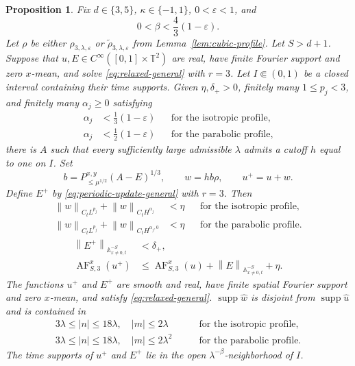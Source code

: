 \documentclass[12pt,reqno,letterpaper]{amsart}
\numberwithin{equation}{section}
\newtheorem{proposition}[theorem]{Proposition}
\theoremstyle{definition}
\newcommand{\T}{\mathbb T}
\newcommand{\A}{\mathbb A}
\newcommand{\eps}{\varepsilon}
\newcommand{\la}{\lambda}
\newcommand{\supp}{\operatorname{supp}}
\newcommand{\norm}[1]{\left\lVert #1\right\rVert}
\newcommand{\abs}[1]{\left\lvert #1\right\rvert}
\begin{document}
\begin{proposition}
\label{prop:cubic-periodic-onestep}
Fix $d\in\{3,5\}$, $\kappa\in\{-1,1\}$,
$0<\eps<1$, and
\[
 0<\beta<\frac43(1-\eps).
\]
Let $\rho$ be either $\rho_{3,\la,\eps}$ or
$\widetilde{\rho}_{3,\la,\eps}$ from
Lemma~\ref{lem:cubic-profile}.
Let $S>d+1$.  Suppose that $u,E\in C^\infty([0,1]\times\T^2)$
are real, have finite Fourier support and zero $x$-mean, and solve
\eqref{eq:relaxed-general} with $r=3$.
Let $I\Subset(0,1)$ be a closed interval containing their time supports.
Given $\eta,\delta_+>0$, finitely many $1\leq p_j<3$, and finitely
many $\alpha_j\geq0$ satisfying
\begin{equation}\label{eq:cubic-periodic-alpha-condition}
 \begin{aligned}
 \alpha_j&<\frac13(1-\eps)
 &&\text{for the isotropic profile},\\
 \alpha_j&<\frac12(1-\eps)
 &&\text{for the parabolic profile},
 \end{aligned}
\end{equation}
there is $A$ such that every sufficiently large admissible $\la$ admits
a cutoff $h$ equal to one on $I$.  Set
\[
 b=P_{\leq\mu^{1/2}}^{x,y}(A-E)^{1/3},
 \qquad w=hb\rho,
 \qquad u^+=u+w.
\]
Define $E^+$ by
\eqref{eq:periodic-update-general} with $r=3$.  Then
\begin{equation}\label{eq:cubic-periodic-onestep-regularity}
 \begin{aligned}
 \norm w_{C_tL^{p_j}}+\norm w_{C_tH^{\alpha_j}}&<\eta
 &&\text{for the isotropic profile},\\
 \norm w_{C_tL^{p_j}}+\norm w_{C_tH^{\alpha_j,0}}&<\eta
 &&\text{for the parabolic profile}.
 \end{aligned}
\end{equation}
\begin{align}
 \norm{E^+}_{\A^{-S}_{x\neq0,t}}&<\delta_+,
 \label{eq:cubic-periodic-onestep-error}\\
 \operatorname{AF}_{S,3}^x(u^+)
 &\leq\operatorname{AF}_{S,3}^x(u)
   +\norm E_{\A^{-S}_{x\neq0,t}}+\eta.
 \label{eq:cubic-periodic-onestep-AF}
\end{align}
The functions $u^+$ and $E^+$ are smooth and real, have finite spatial
Fourier support and zero $x$-mean, and satisfy
\eqref{eq:relaxed-general}.
$\supp\widehat w$ is disjoint from $\supp\widehat u$ and is contained in
\begin{equation}\label{eq:cubic-periodic-support}
 \begin{aligned}
 3\la\leq\abs n\leq18\la,\quad \abs m\leq2\la
 &\qquad\text{for the isotropic profile},\\
 3\la\leq\abs n\leq18\la,\quad \abs m\leq2\la^2
 &\qquad\text{for the parabolic profile}.
 \end{aligned}
\end{equation}
The time supports of
$u^+$ and $E^+$ lie in the open $\la^{-\beta}$-neighborhood of $I$.
\end{proposition}
\end{document}
